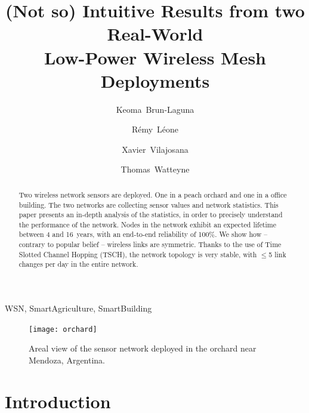 \documentclass{elsarticle}
\begin{document}
	
\begin{frontmatter}
    
\date{}
	
\title{(Not so) Intuitive Results from two Real-World\\Low-Power Wireless Mesh Deployments}

\author[inria]{Keoma~Brun-Laguna}
\author[inria]{R\'emy~L\'eone}
\author[uoc]{Xavier~Vilajosana}
\author[inria]{Thomas~Watteyne}

\address[inria]{Inria, EVA team, Paris, France}
\address[uoc]{Univ. Oberta de Catalunya, Barcelona, Catalonia, Spain}



\begin{abstract}
Two wireless network sensors are deployed.
One in a peach orchard and one in a office building.
The two networks are collecting sensor values and network statistics.
This paper presents an in-depth analysis of the statistics, in order to precisely understand the performance of the network.
Nodes in the network exhibit an expected lifetime between 4 and 16~years, with an end-to-end reliability of 100\%.
We show how -- contrary to popular belief -- wireless links are symmetric.
Thanks to the use of Time Slotted Channel Hopping (TSCH), the network topology is very stable, with $\leq$5 link changes per day in the entire network.
\end{abstract}

\begin{keyword}
    WSN, SmartAgriculture, SmartBuilding
\end{keyword}

\end{frontmatter}


\begin{figure}
    \centering
    \texttt{[image: orchard]}
    \caption{Areal view of the sensor network deployed in the orchard near Mendoza, Argentina.}
    \label{fig:orchard}
\end{figure}

\section{Introduction}
\label{sec:intro}
\end{document}
